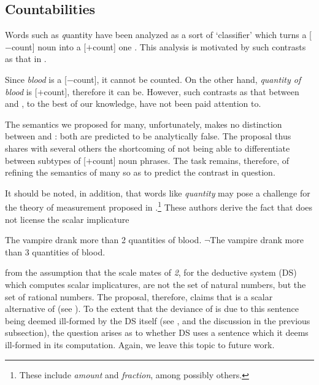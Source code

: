 \documentclass[output=paper]{langscibook}
\begin{document}
\subsection{Countabilities} \label{hai-tri:sec:countabilities}

Words such as {\textit quantity} have been analyzed as a sort of `classifier' which turns a [$-$count] noun into a [$+$count] one \citep[cf.][]{Chierchia:2010}. This analysis is motivated by such contrasts as that in . 

\ea \label{hai-tri:vampire}
\label{hai-tri:bloods}
\label{hai-tri:quantitiesofblood}
\z
\z

\noindent Since \textit{blood} is a [$-$count], it cannot be counted. On the other hand, \textit{quantity of blood} is [$+$count], therefore it can be. However, such contrasts as that between  and , to the best of our knowledge, have not been paid attention to.

\label{hai-tri:2.3}
\z

\noindent The semantics we proposed for {\sc many}, unfortunately, makes no distinction between  and : both are predicted to be analytically false. The proposal thus shares with several others the shortcoming of not being able to differentiate between subtypes of [$+$count] noun phrases. The task remains, therefore, of refining the semantics of {\sc many} so as to predict the contrast in question.

It should be noted, in addition, that words like \textit{quantity} may pose a challenge for the theory of measurement proposed in \citet{foxhackl2006universal}.\footnote{These include \textit{amount} and \textit{fraction}, among possibly others.

\ea
{}
\z
\z
} These authors derive the fact that  does not license the scalar implicature  

\ea
\ea The vampire drank more than 2 quantities of blood.
\label{hai-tri:morethan2}
\ex $\neg$The vampire drank more than 3 quantities of blood.
\label{hai-tri:morethan3}
\z
\z

\noindent from the assumption that the scale mates of \textit{2}, for the deductive system (DS) which computes scalar implicatures, are not the set of natural numbers, but the set of rational numbers. The proposal, therefore, claims that  is a scalar alternative of  (see ). To the extent that the deviance of  is due to this sentence being deemed ill-formed by the DS itself (see \citealt{gajewski2003analyticity, foxhackl2006universal}, and the discussion in the previous subsection), the question arises as to whether DS uses a sentence which it deems ill-formed in its computation. Again, we leave this topic to future work.  
\end{document}
